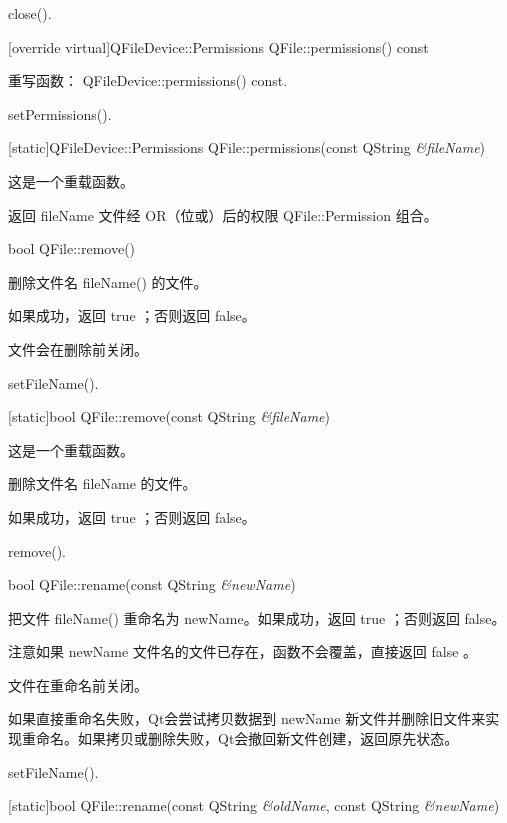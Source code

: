 \begin{notice}[另请参阅]
 close().
\end{notice}

[override virtual]QFileDevice::Permissions QFile::permissions() const

重写函数： QFileDevice::permissions() const.

\begin{notice}[另请参阅]
setPermissions().
\end{notice}

[static]QFileDevice::Permissions QFile::permissions(const QString \emph{\&fileName})

这是一个重载函数。

返回 fileName 文件经 OR（位或）后的权限 QFile::Permission 组合。

bool QFile::remove()

删除文件名 fileName() 的文件。

如果成功，返回 true ；否则返回 false。

文件会在删除前关闭。

\begin{notice}[另请参阅]
setFileName().
\end{notice}

[static]bool QFile::remove(const QString \emph{\&fileName})

这是一个重载函数。

删除文件名 fileName 的文件。

如果成功，返回 true ；否则返回 false。

\begin{notice}[另请参阅]
remove().
\end{notice}

bool QFile::rename(const QString \emph{\&newName})

把文件 fileName() 重命名为 newName。如果成功，返回 true ；否则返回 false。

注意如果 newName 文件名的文件已存在，函数不会覆盖，直接返回 false 。

文件在重命名前关闭。

如果直接重命名失败，Qt会尝试拷贝数据到 newName 新文件并删除旧文件来实现重命名。如果拷贝或删除失败，Qt会撤回新文件创建，返回原先状态。



\begin{notice}[另请参阅]
setFileName().
\end{notice}

[static]bool QFile::rename(const QString \emph{\&oldName}, const QString \emph{\&newName})

